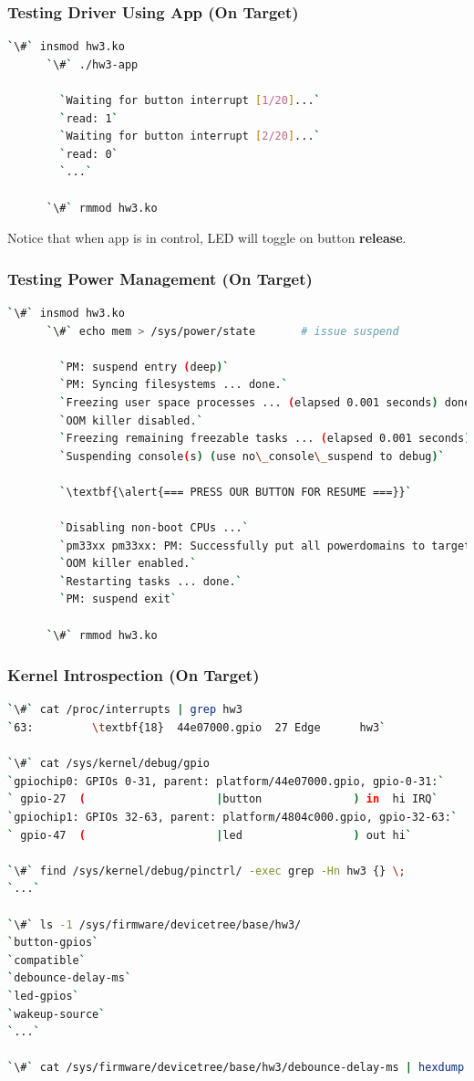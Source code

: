 \begin{frame}[containsverbatim]
  \frametitle{Testing Driver Using App (On Target)}
  \begin{lstlisting}[language=bash,numbers=none]
      `\#` insmod hw3.ko
      `\#` ./hw3-app

        `Waiting for button interrupt [1/20]...`
        `read: 1`
        `Waiting for button interrupt [2/20]...`
        `read: 0`
        `...`

      `\#` rmmod hw3.ko
  \end{lstlisting}
  Notice that when app is in control, LED will toggle on button
  \textbf{release}.
\end{frame}

\begin{frame}[containsverbatim]
  \frametitle{Testing Power Management (On Target)}
  \begin{lstlisting}[language=bash,numbers=none]
      `\#` insmod hw3.ko
      `\#` echo mem > /sys/power/state       # issue suspend

        `PM: suspend entry (deep)`
        `PM: Syncing filesystems ... done.`
        `Freezing user space processes ... (elapsed 0.001 seconds) done.`
        `OOM killer disabled.`
        `Freezing remaining freezable tasks ... (elapsed 0.001 seconds) done.`
        `Suspending console(s) (use no\_console\_suspend to debug)`

        `\textbf{\alert{=== PRESS OUR BUTTON FOR RESUME ===}}`

        `Disabling non-boot CPUs ...`
        `pm33xx pm33xx: PM: Successfully put all powerdomains to target state`
        `OOM killer enabled.`
        `Restarting tasks ... done.`
        `PM: suspend exit`

      `\#` rmmod hw3.ko
  \end{lstlisting}
\end{frame}

\begin{frame}[containsverbatim]
  \frametitle{Kernel Introspection (On Target)}
  \begin{lstlisting}[language=bash,numbers=none]
`\#` cat /proc/interrupts | grep hw3
`63:         \textbf{18}  44e07000.gpio  27 Edge      hw3`

`\#` cat /sys/kernel/debug/gpio
`gpiochip0: GPIOs 0-31, parent: platform/44e07000.gpio, gpio-0-31:`
` gpio-27  (                    |button              ) in  hi IRQ`
`gpiochip1: GPIOs 32-63, parent: platform/4804c000.gpio, gpio-32-63:`
` gpio-47  (                    |led                 ) out hi`

`\#` find /sys/kernel/debug/pinctrl/ -exec grep -Hn hw3 {} \;
`...`

`\#` ls -1 /sys/firmware/devicetree/base/hw3/
`button-gpios`
`compatible`
`debounce-delay-ms`
`led-gpios`
`wakeup-source`
`...`

`\#` cat /sys/firmware/devicetree/base/hw3/debounce-delay-ms | hexdump
  \end{lstlisting}
  \vspace*{-10mm}
\end{frame}

